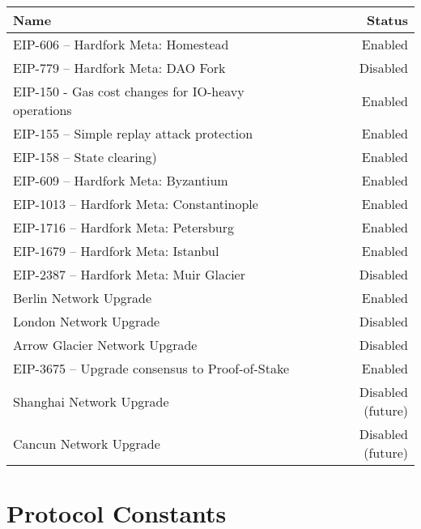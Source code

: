\documentclass[9pt,oneside]{amsart}
\begin{document}
\begin{tabu}{l r }
\toprule
Name & Status \\
\midrule
EIP-606 -- Hardfork Meta: Homestead & \quad \quad \quad \quad \quad \quad \quad \quad \quad \quad \quad \quad \quad \quad \quad \quad \quad \quad \quad \quad \quad \quad  Enabled \\
EIP-779 -- Hardfork Meta: DAO Fork & Disabled \\
EIP-150 - Gas cost changes for IO-heavy operations & Enabled \\
EIP-155 -- Simple replay attack protection &  Enabled \\
EIP-158 -- State clearing) & Enabled \\
EIP-609 -- Hardfork Meta: Byzantium & Enabled \\
EIP-1013 -- Hardfork Meta: Constantinople & Enabled \\
EIP-1716 -- Hardfork Meta: Petersburg & Enabled \\
EIP-1679 -- Hardfork Meta: Istanbul & Enabled \\
EIP-2387 -- Hardfork Meta: Muir Glacier & Disabled \\
Berlin Network Upgrade & Enabled \\
London Network Upgrade & Disabled \\
Arrow Glacier Network Upgrade & Disabled \\
EIP-3675 -- Upgrade consensus to Proof-of-Stake & Enabled \\
Shanghai Network Upgrade & Disabled (future) \\
Cancun Network Upgrade & Disabled (future)  \\
\bottomrule
\end{tabu}



\section{Protocol Constants}\label{sec:constants1}
\end{document}
